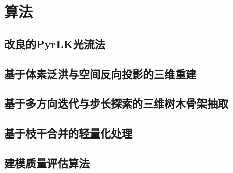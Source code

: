 
\chapter{算法}
\label{cha:algorithm}

\section{改良的PyrLK光流法}
\label{sec:pyrlk}

\section{基于体素泛洪与空间反向投影的三维重建}
\label{sec:3drec}

\section{基于多方向迭代与步长探索的三维树木骨架抽取}
\label{sec:sklextract}

\section{基于枝干合并的轻量化处理}
\label{sec:branchcombine}

\section{建模质量评估算法}
\label{sec:qualityevaluation}

